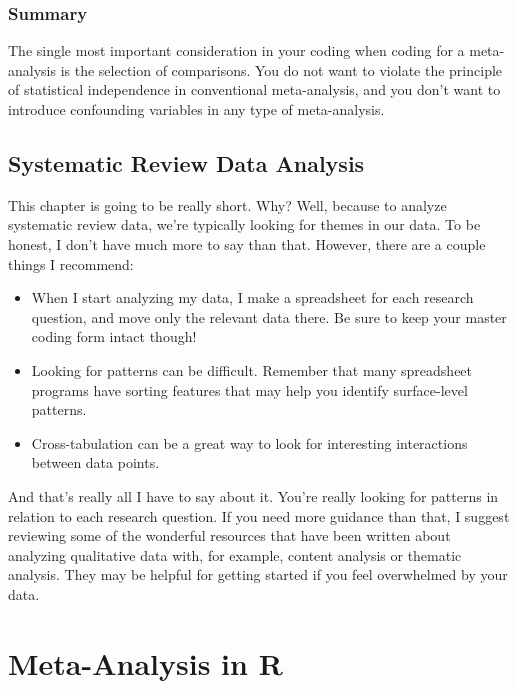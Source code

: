 \documentclass[
]{book}
\begin{document}
\hypertarget{summary-1}{%
\section{Summary}\label{summary-1}}

The single most important consideration in your coding when coding for a meta-analysis is the selection of comparisons. You do not want to violate the principle of statistical independence in conventional meta-analysis, and you don't want to introduce confounding variables in any type of meta-analysis.

\hypertarget{systematic-review-data-analysis}{%
\chapter{Systematic Review Data Analysis}\label{systematic-review-data-analysis}}

This chapter is going to be really short. Why? Well, because to analyze systematic review data, we're typically looking for themes in our data. To be honest, I don't have much more to say than that. However, there are a couple things I recommend:

\begin{itemize}
\item
  When I start analyzing my data, I make a spreadsheet for each research question, and move only the relevant data there. Be sure to keep your master coding form intact though!
\item
  Looking for patterns can be difficult. Remember that many spreadsheet programs have sorting features that may help you identify surface-level patterns.
\item
  Cross-tabulation can be a great way to look for interesting interactions between data points.
\end{itemize}

And that's really all I have to say about it. You're really looking for patterns in relation to each research question. If you need more guidance than that, I suggest reviewing some of the wonderful resources that have been written about analyzing qualitative data with, for example, content analysis or thematic analysis. They may be helpful for getting started if you feel overwhelmed by your data.

\hypertarget{part-meta-analysis-in-r}{%
\part{Meta-Analysis in R}\label{part-meta-analysis-in-r}}
\end{document}
